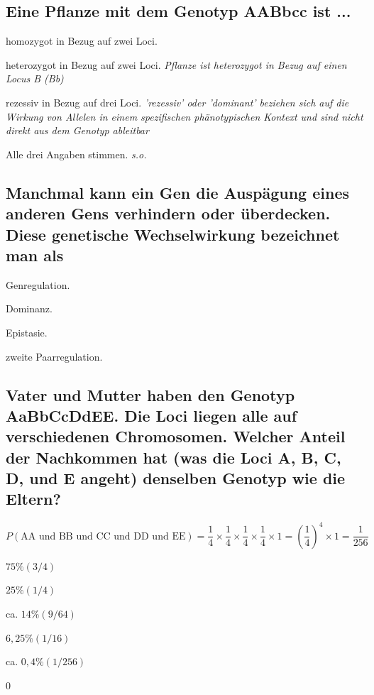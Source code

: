 \documentclass{article}
\newcommand{\cmark}{\ding{51}}%
\newcommand{\done}{\rlap{$\square$}{\raisebox{2pt}{\large\hspace{1pt}\cmark}}%
\hspace{-2.5pt}}
\begin{document}
\subsection*{Eine Pflanze mit dem Genotyp AABbcc ist ...}
\begin{todolist} %
\item[\done] homozygot in Bezug auf zwei Loci.
\item heterozygot in Bezug auf zwei Loci. \textit{\scriptsize Pflanze ist heterozygot in Bezug auf einen Locus B (Bb)}
\item rezessiv in Bezug auf drei Loci. \textit{\scriptsize  'rezessiv' oder 'dominant' beziehen sich auf die Wirkung von Allelen in einem spezifischen phänotypischen Kontext und sind nicht direkt aus dem Genotyp ableitbar}
\item Alle drei Angaben stimmen. \textit{\scriptsize s.o.}
\end{todolist}
\subsection*{Manchmal kann ein Gen die Auspägung eines anderen Gens verhindern
oder überdecken. Diese genetische Wechselwirkung bezeichnet man als}
\begin{todolist}%
\item Genregulation.
\item Dominanz.
\item [\done]Epistasie.
\item zweite Paarregulation.
\end{todolist}
\subsection*{Vater und Mutter haben den Genotyp AaBbCcDdEE. Die Loci liegen alle
auf verschiedenen Chromosomen. Welcher Anteil der Nachkommen hat
(was die Loci A, B, C, D, und E angeht) denselben Genotyp wie die
Eltern?}
\[
P(\text{AA} \text{ und } \text{BB} \text{ und } \text{CC} \text{ und } \text{DD} \text{ und } \text{EE}) = \frac{1}{4} \times \frac{1}{4} \times \frac{1}{4} \times \frac{1}{4} \times 1 = \left(\frac{1}{4}\right)^4 \times 1 = \frac{1}{256}
\]
\begin{todolist}%
\item $75 \% (3/4)$
\item $25 \% (1/4)$
\item ca. $14 \% (9/64)$
\item $6,25 \% (1/16)$
\item[\done] ca. $0,4 \% (1/256)$
\item 0
\end{todolist}
\end{document}
